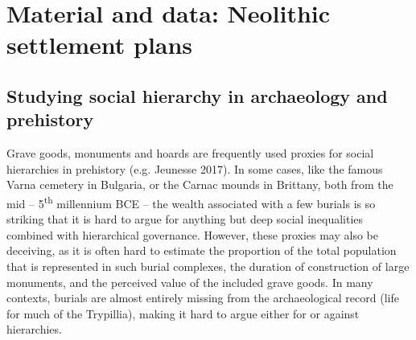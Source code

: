 \documentclass[
  12pt,
  a4paper, twoside]{book}
\begin{document}
\hypertarget{material}{%
\chapter{Material and data: Neolithic settlement plans}\label{material}}

\hypertarget{complexity-archaeo}{%
\section{Studying social hierarchy in archaeology and prehistory}\label{complexity-archaeo}}

Grave goods, monuments and hoards are frequently used proxies for social hierarchies in prehistory (e.g. Jeunesse 2017). In some cases, like the famous Varna cemetery in Bulgaria, or the Carnac mounds in Brittany, both from the mid -- 5\textsuperscript{th} millennium BCE -- the wealth associated with a few burials is so striking that it is hard to argue for anything but deep social inequalities combined with hierarchical governance. However, these proxies may also be deceiving, as it is often hard to estimate the proportion of the total population that is represented in such burial complexes, the duration of construction of large monuments, and the perceived value of the included grave goods. In many contexts, burials are almost entirely missing from the archaeological record (life for much of the Trypillia), making it hard to argue either for or against hierarchies.
\end{document}
